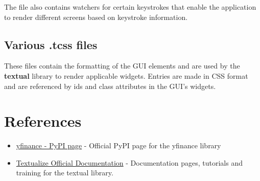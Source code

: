 \documentclass{article}
\begin{document}
The file also contains watchers for certain keystrokes that enable the application to render different screens based on keystroke information.

\subsection{Various .tcss files}
These files contain the formatting of the GUI elements and are used by the \textbf{textual} library to render applicable widgets. Entries are made in CSS format and are referenced by ids and class attributes in the GUI's widgets.



\section{References}

\begin{itemize}
    \item \href{https://pypi.org/project/yfinance/}{yfinance - PyPI page} - Official PyPI page for the yfinance library
    \item \href{https://textual.textualize.io/}{Textualize Official Documentation} - Documentation pages, tutorials and training for the textual library.
\end{itemize}
\end{document}
